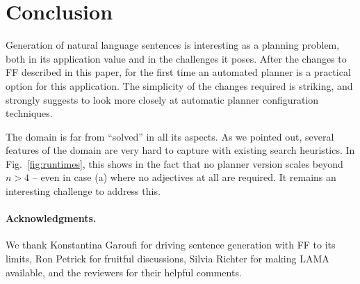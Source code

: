 
\section{Conclusion} \label{sec:conclusion}


Generation of natural language sentences is interesting as a planning
problem, both in its application value and in the challenges it
poses. After the changes to FF described in this paper, for the first
time an automated planner is a practical option for this
application. The simplicity of the changes required is striking, and
strongly suggests to look more closely at automatic planner
configuration techniques.


The domain is far from ``solved'' in all its aspects. As we pointed
out, several features of the domain are very hard to capture with
existing search heuristics. In Fig.~\ref{fig:runtimes}, this shows in
the fact that no planner version scales beyond $n>4$ -- even in case
(a) where no adjectives at all are required. It remains an interesting
challenge to address this.


\paragraph{Acknowledgments.} We thank Konstantina Garoufi for driving
sentence generation with FF to its limits, Ron Petrick for fruitful
discussions, Silvia Richter for making LAMA available, and the
reviewers for their helpful comments. 




